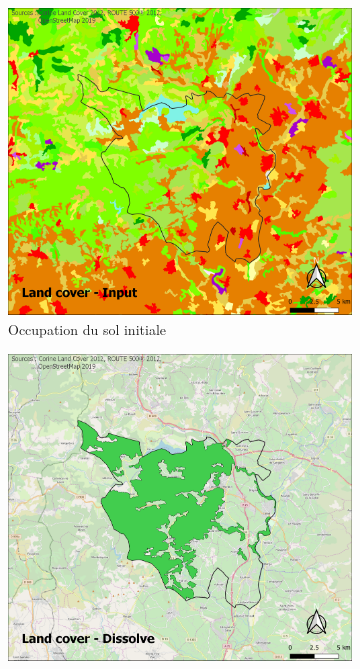 \documentclass[11pt]{article}
\begin{document}
\begin{figure}[h!]
\centering
   \begin{subfigure}[b]{.48\textwidth}
      \includegraphics[width=\textwidth]{pictures/landuseInput.png}
      \caption{Occupation du sol initiale}
   \end{subfigure}
   \begin{subfigure}[b]{.48\textwidth}
      \includegraphics[width=\textwidth]{pictures/landuseDissolve.png}

\end{subfigure}
\end{figure}
\end{document}
